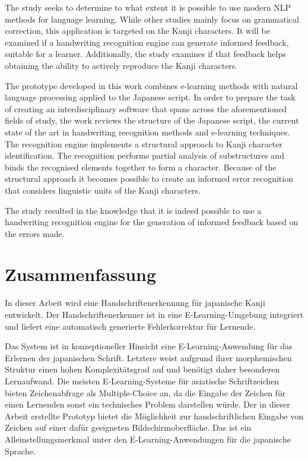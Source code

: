The study seeks to determine to what extent it is possible to use modern NLP 
methods for language learning. While other studies mainly focus on grammatical
correction, this application is targeted on the Kanji characters. It will be 
examined if a handwriting recognition engine can generate informed feedback,
suitable for a learner. Additionally, the study examines if that feedback helps 
obtaining the ability to actively reproduce the Kanji characters.

The prototype developed in this work combines e-learning methods with natural
language processing applied to the Japanese script. In order to prepare the 
task of creating an interdisciplinary software that spans across the aforementioned 
fields of study, the work reviews the structure of the Japanese script, 
the current state of the art in handwriting recognition methods and e-learning 
techniques.
The recognition engine implements a structural approach to Kanji character 
identification. The recognition performs partial analysis of substructures
and binds the recognised elements together to form a character.
Because of the structural approach it becomes possible to create an informed
error recognition that considers linguistic units of the Kanji characters.

The study resulted in the knowledge that it is indeed possible to use a handwriting
recognition engine for the generation of informed feedback based on the errors made.

\chapter*{Zusammenfassung}
\label{chap:zusammenfassung}

In dieser Arbeit wird eine Handschriftenerkennung für japanische Kanji 
entwickelt. Der Handschriftenerkenner ist in eine E-Learning-Umgebung integriert und
liefert eine automatisch generierte Fehlerkorrektur für Lernende.

Das System ist in konzeptioneller Hinsicht eine E-Learning-Anwendung für das 
Erlernen der japanischen Schrift. Letztere weist aufgrund ihrer morphemischen 
Struktur einen hohen Komplexitätsgrad auf und benötigt daher besonderen Lernaufwand.
Die meisten E-Learning-Systeme für asiatische Schriftzeichen bieten Zeichenabfrage
als Multiple-Choice an, da die Eingabe der Zeichen für einen Lernenden sonst 
ein technisches Problem darstellen würde.
Der in dieser Arbeit erstellte Prototyp bietet die Möglichkeit 
zur handschriftlichen Eingabe von Zeichen auf einer dafür geeigneten 
Bildschirmoberfläche. Das ist ein Alleinstellungsmerkmal unter den 
E-Learning-Anwendungen für die japanische Sprache.


